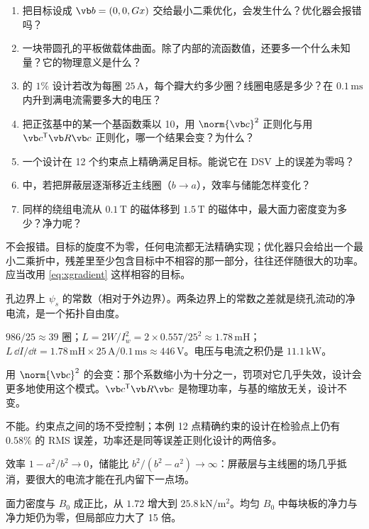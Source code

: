 \begin{selfcheck}
\begin{enumerate}
\item 把目标设成 $\vb b=(0,0,Gx)$ 交给最小二乘优化，会发生什么？优化器会报错吗？
\item 一块带圆孔的平板做载体曲面。除了内部的流函数值，还要多一个什么未知量？它的物理意义是什么？
\item {} 的 $1\%$ 设计若改为每圈 $25\,\mathrm A$，每个瓣大约多少圈？线圈电感是多少？在 $0.1\,\mathrm{ms}$ 内升到满电流需要多大的电压？
\item 把正弦基中的某一个基函数乘以 10，用 $\norm{\vb c}^2$ 正则化与用 $\vb c^{\mathsf T}\vb R\vb c$ 正则化，哪一个结果会变？为什么？
\item 一个设计在 12 个约束点上精确满足目标。能说它在 DSV 上的误差为零吗？
\item {} 中，若把屏蔽层逐渐移近主线圈（$b\to a$），效率与储能怎样变化？
\item 同样的绕组电流从 $0.1\,\mathrm T$ 的磁体移到 $1.5\,\mathrm T$ 的磁体中，最大面力密度变为多少？净力呢？
\end{enumerate}
\end{selfcheck}

\begin{answers}
\item 不会报错。目标的旋度不为零，任何电流都无法精确实现；优化器只会给出一个最小二乘折中，残差里至少包含目标中不相容的那一部分，往往还伴随很大的功率。应当改用 \eqref{eq:xgradient} 这样相容的目标。
\item 孔边界上 $\psi_s$ 的常数（相对于外边界）。两条边界上的常数之差就是绕孔流动的净电流，是一个拓扑自由度。
\item $986/25\approx39$ 圈；$L=2W/I_w^2=2\times0.557/25^2\approx1.78\,\mathrm{mH}$；$L\,\dd I/\dd t=1.78\,\mathrm{mH}\times25\,\mathrm A/0.1\,\mathrm{ms}\approx446\,\mathrm V$。电压与电流之积仍是 $11.1\,\mathrm{kW}$。
\item 用 $\norm{\vb c}^2$ 的会变：那个系数缩小为十分之一，罚项对它几乎失效，设计会更多地使用这个模式。$\vb c^{\mathsf T}\vb R\vb c$ 是物理功率，与基的缩放无关，设计不变。
\item 不能。约束点之间的场不受控制；本例 12 点精确约束的设计在检验点上仍有 $0.58\%$ 的 RMS 误差，功率还是同等误差正则化设计的两倍多。
\item 效率 $1-a^2/b^2\to0$，储能比 $b^2/(b^2-a^2)\to\infty$：屏蔽层与主线圈的场几乎抵消，要很大的电流才能在孔内留下一点场。
\item 面力密度与 $B_0$ 成正比，从 $1.72$ 增大到 $25.8\,\mathrm{kN/m^2}$。均匀 $B_0$ 中每块板的净力与净力矩仍为零，但局部应力大了 15 倍。
\end{answers}

